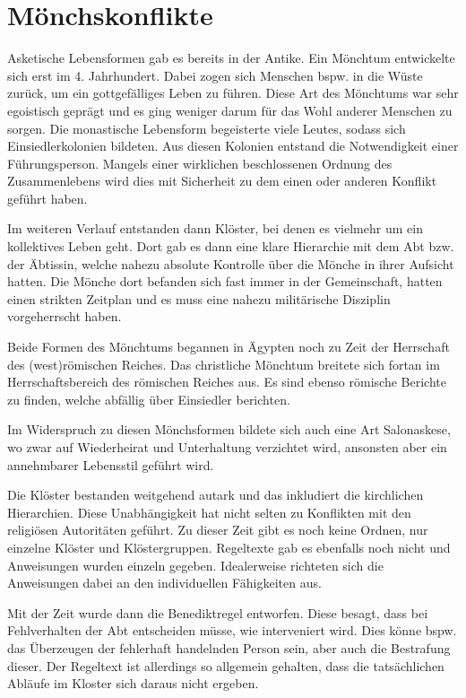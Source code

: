 \documentclass[10pt,a4paper,oneside,ngerman,numbers=noenddot]{scrartcl}
\begin{document}
\section{Mönchskonflikte}

Asketische Lebensformen gab es bereits in der Antike. Ein Mönchtum entwickelte
sich erst im 4. Jahrhundert. Dabei zogen sich Menschen bspw. in die Wüste zurück,
um ein gottgefälliges Leben zu führen. Diese Art des Mönchtums war sehr
egoistisch geprägt und es ging weniger darum für das Wohl anderer Menschen
zu sorgen. Die monastische Lebensform begeisterte viele Leutes, sodass
sich Einsiedlerkolonien bildeten. Aus diesen Kolonien entstand die Notwendigkeit
einer Führungsperson. Mangels einer wirklichen beschlossenen Ordnung des
Zusammenlebens wird dies mit Sicherheit zu dem einen oder anderen Konflikt
geführt haben.

Im weiteren Verlauf entstanden dann Klöster, bei denen es vielmehr um ein
kollektives Leben geht. Dort gab es dann eine klare Hierarchie mit dem Abt bzw.
der Äbtissin, welche nahezu absolute Kontrolle über die Mönche in ihrer Aufsicht
hatten. Die Mönche dort befanden sich fast immer in der Gemeinschaft, hatten
einen strikten Zeitplan und es muss eine nahezu militärische Disziplin vorgeherrscht
haben.

Beide Formen des Mönchtums begannen in Ägypten noch zu Zeit der Herrschaft des
(west)römischen Reiches. Das christliche Mönchtum breitete sich fortan
im Herrschaftsbereich des römischen Reiches aus. Es sind ebenso römische Berichte
zu finden, welche abfällig über Einsiedler berichten.

Im Widerspruch zu diesen Mönchsformen bildete sich auch eine Art Salonaskese,
wo zwar auf Wiederheirat und Unterhaltung verzichtet wird, ansonsten aber ein
annehmbarer Lebensstil geführt wird.

Die Klöster bestanden weitgehend autark und das inkludiert die kirchlichen Hierarchien.
Diese Unabhängigkeit hat nicht selten zu Konflikten mit den religiösen Autoritäten
geführt. Zu dieser Zeit gibt es noch keine Ordnen, nur einzelne Klöster und Klöstergruppen.
Regeltexte gab es ebenfalls noch nicht und Anweisungen wurden einzeln gegeben.
Idealerweise richteten sich die Anweisungen dabei an den individuellen Fähigkeiten
aus.

Mit der Zeit wurde dann die Benediktregel entworfen. Diese besagt, dass bei
Fehlverhalten der Abt entscheiden müsse, wie interveniert wird. Dies könne
bspw. das Überzeugen der fehlerhaft handelnden Person sein, aber auch die Bestrafung
dieser. Der Regeltext ist allerdings so allgemein gehalten, dass die tatsächlichen
Abläufe im Kloster sich daraus nicht ergeben.
\end{document}
